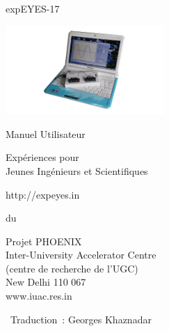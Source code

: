 \documentclass[12pt,a4paper]{report}
\begin{document}
\begin{titlepage}
\thispagestyle{empty}

\vspace{0.2in}

\begin{center}
{\Huge{}expEYES-17}
\par\end{center}{\Huge \par}

\begin{center}
\includegraphics[width=6cm]{../../pics/eyes17-nb}
\par\end{center}

\begin{center}
{\large{}Manuel Utilisateur }
\par\end{center}{\large \par}

\begin{center}
{\LARGE{}Expériences pour}\\
{\LARGE{} Jeunes Ingénieurs et Scientifiques}
\par\end{center}{\LARGE \par}

\begin{center}
http://expeyes.in
\par\end{center}

\begin{center}
du
\par\end{center}

\begin{center}
Projet PHOENIX\\
Inter-University Accelerator Centre \\
(centre de recherche de l'UGC)\\
New Delhi 110 067\\
www.iuac.res.in
\par\end{center}

\vfill

{~\hfill \small Traduction : Georges Khaznadar}

\end{titlepage}
\end{document}

